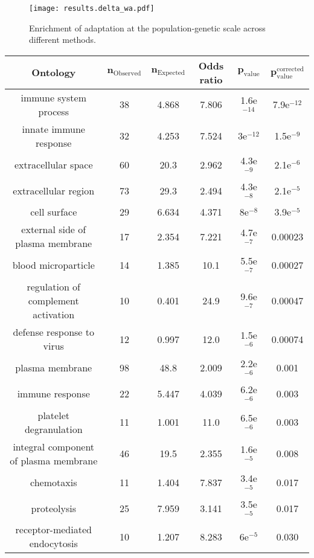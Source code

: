 \documentclass{article}
\begin{document}
\begin{figure*}[h!]
	\centering
	\texttt{[image: results.delta\_wa.pdf]}
	\label{fig:pvalues}
	\caption{Enrichment of adaptation at the population-genetic scale across different methods.}
\end{figure*}


\begin{table*}[h!]
	\centering
	\begin{adjustbox}{width = 1\textwidth}
		\small
		\begin{tabular}{|c|c|c|c|c|c|}
			\hline
			\textbf{Ontology} & $\bm{n_{\mathrm{Observed}}}$ & $\bm{n_{\mathrm{Expected}}}$ & \textbf{Odds ratio} & $\bm{p_{\mathrm{value}}}$ & $\bm{p_{\mathrm{value}}^{\mathrm{corrected}}}$		\\
			\hline
			immune system process & 38 & 4.868 & 7.806 & 1.6e$^{-14}$ & 7.9e$^{-12}$ \\
			innate immune response & 32 & 4.253 & 7.524 & 3e$^{-12}$ & 1.5e$^{-9}$ \\
			extracellular space & 60 & 20.3 & 2.962 & 4.3e$^{-9}$ & 2.1e$^{-6}$ \\
			extracellular region & 73 & 29.3 & 2.494 & 4.3e$^{-8}$ & 2.1e$^{-5}$ \\
			cell surface & 29 & 6.634 & 4.371 & 8e$^{-8}$ & 3.9e$^{-5}$ \\
			external side of plasma membrane & 17 & 2.354 & 7.221 & 4.7e$^{-7}$ & 0.00023 \\
			blood microparticle & 14 & 1.385 & 10.1 & 5.5e$^{-7}$ & 0.00027 \\
			regulation of complement activation & 10 & 0.401 & 24.9 & 9.6e$^{-7}$ & 0.00047 \\
			defense response to virus & 12 & 0.997 & 12.0 & 1.5e$^{-6}$ & 0.00074 \\
			plasma membrane & 98 & 48.8 & 2.009 & 2.2e$^{-6}$ & 0.001 \\
			immune response & 22 & 5.447 & 4.039 & 6.2e$^{-6}$ & 0.003 \\
			platelet degranulation & 11 & 1.001 & 11.0 & 6.5e$^{-6}$ & 0.003 \\
			integral component of plasma membrane & 46 & 19.5 & 2.355 & 1.6e$^{-5}$ & 0.008 \\
			chemotaxis & 11 & 1.404 & 7.837 & 3.4e$^{-5}$ & 0.017 \\
			proteolysis & 25 & 7.959 & 3.141 & 3.5e$^{-5}$ & 0.017 \\
			receptor-mediated endocytosis & 10 & 1.207 & 8.283 & 6e$^{-5}$ & 0.030 \\

\end{tabular}
\end{adjustbox}
\end{table*}
\end{document}
